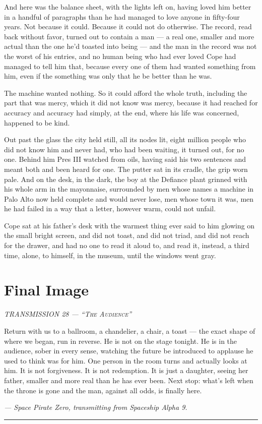 \documentclass[11pt,openany]{book}
\newcommand{\transheader}{\normalfont\footnotesize\scshape\letterspace}
\newcommand{\letterspace}{}
\newenvironment{transmission}{%
  \par\vspace{0.3\baselineskip}\begin{center}\begin{minipage}{0.88\textwidth}%
  \itshape\small\setlength{\parindent}{0pt}\setstretch{1.06}}%
  {\end{minipage}\end{center}\vspace{0.4\baselineskip}%
  \noindent\hfil\rule{0.35\textwidth}{0.3pt}\hfil\par\vspace{1.0\baselineskip}}
\begin{document}
And here was the balance sheet, with the lights left on, having loved him better in a handful of paragraphs than he had managed to love anyone in fifty-four years. Not because it could. Because it could not do otherwise. The record, read back without favor, turned out to contain a man --- a real one, smaller and more actual than the one he'd toasted into being --- and the man in the record was not the worst of his entries, and no human being who had ever loved Cope had managed to tell him that, because every one of them had wanted something from him, even if the something was only that he be better than he was.

The machine wanted nothing. So it could afford the whole truth, including the part that was mercy, which it did not know was mercy, because it had reached for accuracy and accuracy had simply, at the end, where his life was concerned, happened to be kind.

Out past the glass the city held still, all its nodes lit, eight million people who did not know him and never had, who had been waiting, it turned out, for no one. Behind him Pres III watched from oils, having said his two sentences and meant both and been heard for one. The putter sat in its cradle, the grip worn pale. And on the desk, in the dark, the boy at the Defiance plant grinned with his whole arm in the mayonnaise, surrounded by men whose names a machine in Palo Alto now held complete and would never lose, men whose town it was, men he had failed in a way that a letter, however warm, could not unfail.

Cope sat at his father's desk with the warmest thing ever said to him glowing on the small bright screen, and did not toast, and did not triad, and did not reach for the drawer, and had no one to read it aloud to, and read it, instead, a third time, alone, to himself, in the museum, until the windows went gray.

\clearpage
\chapter{Final Image}

\begin{transmission}
{\transheader TRANSMISSION 28 --- ``The Audience''}\par\vspace{0.5em}
Return with us to a ballroom, a chandelier, a chair, a toast --- the exact shape of where we began, run in reverse. He is not on the stage tonight. He is in the audience, sober in every sense, watching the future be introduced to applause he used to think was for him. One person in the room turns and actually looks at him. It is not forgiveness. It is not redemption. It is just a daughter, seeing her father, smaller and more real than he has ever been. Next stop: what's left when the throne is gone and the man, against all odds, is finally here.\par
\vspace{0.5em}\hfill\textit{--- Space Pirate Zero, transmitting from Spaceship Alpha 9.}\par
\end{transmission}
\end{document}

